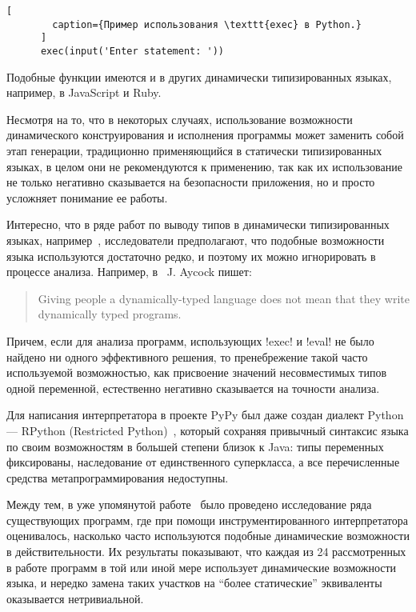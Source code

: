 \begin{description}
      \begin{lstlisting}[
        caption={Пример использования \texttt{exec} в Python.}
      ]
      exec(input('Enter statement: '))  
      \end{lstlisting}

      Подобные функции имеются и в других динамически типизированных языках,
      например, в JavaScript и Ruby.

      Несмотря на то, что в некоторых случаях, использование возможности
      динамического конструирования и исполнения программы может заменить собой
      этап генерации, традиционно применяющийся в статически типизированных
      языках, в целом они не рекомендуются к применению, так как их
      использование не только негативно сказывается на безопасности приложения,
      но и просто усложняет понимание ее работы.

\end{description}

Интересно, что в ряде работ по выводу типов в динамически типизированных языках,
например~\cite{Salib2004,Aycock2000}, исследователи предполагают, что подобные
возможности языка используются достаточно редко, и поэтому их можно игнорировать
в процессе анализа.  Например, в~\cite{Aycock2000} J. Aycock пишет:

\begin{quote} Giving people a dynamically-typed language does not mean that they
  write dynamically typed programs. 
\end{quote}

Причем, если для анализа программ, использующих !exec! и !eval! не было найдено
ни одного эффективного решения, то пренебрежение такой часто используемой
возможностью, как присвоение значений несовместимых типов одной переменной,
естественно негативно сказывается на точности анализа. 

Для написания интерпретатора в проекте PyPy был даже создан диалект Python ---
RPython (Restricted Python)~\cite{Ancona2007}, который сохраняя привычный
синтаксис языка по своим возможностям в большей степени близок к Java: типы
переменных фиксированы, наследование от единственного суперкласса, а все
перечисленные средства метапрограммирования недоступны. 

Между тем, в уже упомянутой работе~\cite{Holkner2009} было проведено
исследование ряда существующих программ, где при помощи инструментированного
интерпретатора оценивалось, насколько часто используются подобные динамические
возможности в действительности. Их результаты показывают, что каждая из 24
рассмотренных в работе программ в той или иной мере использует динамические
возможности языка, и нередко замена таких участков на ``более статические''
эквиваленты оказывается нетривиальной. 


